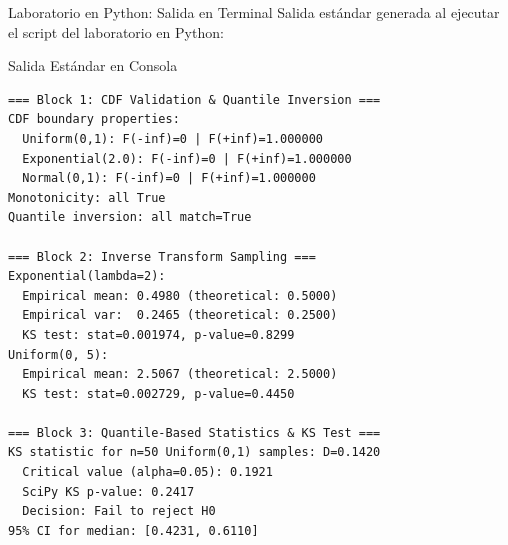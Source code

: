 \documentclass[10pt, aspectratio=169]{beamer}
\begin{document}
\begin{frame}[fragile]{Laboratorio en Python: Salida en Terminal}
  \scriptsize
  Salida estándar generada al ejecutar el script del laboratorio en Python:
  \vspace{0.02cm}
  \begin{block}{Salida Estándar en Consola}
    \fontsize{4pt}{5pt}\selectfont
    \begin{verbatim}
=== Block 1: CDF Validation & Quantile Inversion ===
CDF boundary properties:
  Uniform(0,1): F(-inf)=0 | F(+inf)=1.000000
  Exponential(2.0): F(-inf)=0 | F(+inf)=1.000000
  Normal(0,1): F(-inf)=0 | F(+inf)=1.000000
Monotonicity: all True
Quantile inversion: all match=True

=== Block 2: Inverse Transform Sampling ===
Exponential(lambda=2):
  Empirical mean: 0.4980 (theoretical: 0.5000)
  Empirical var:  0.2465 (theoretical: 0.2500)
  KS test: stat=0.001974, p-value=0.8299
Uniform(0, 5):
  Empirical mean: 2.5067 (theoretical: 2.5000)
  KS test: stat=0.002729, p-value=0.4450

=== Block 3: Quantile-Based Statistics & KS Test ===
KS statistic for n=50 Uniform(0,1) samples: D=0.1420
  Critical value (alpha=0.05): 0.1921
  SciPy KS p-value: 0.2417
  Decision: Fail to reject H0
95% CI for median: [0.4231, 0.6110]
    \end{verbatim}
  \end{block}
\end{frame}





\end{document}

